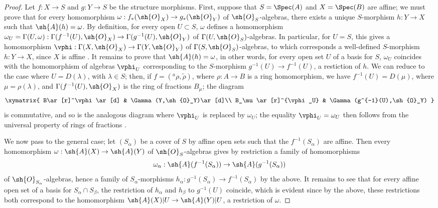 \begin{proof}
\label{proof-2.1.2.7}
Let $f:X\to S$ and $g:Y\to S$ be the structure morphisms.
First, suppose that $S=\Spec(A)$ and $X=\Spec(B)$ are affine; we must prove that for every homomorphism $\omega:f_*(\sh{O}_X)\to g_*(\sh{O}_Y)$ of $\sh{O}_S$-algebras, there exists a unique $S$-morphism $h:Y\to X$ such that $\sh{A}(h)=\omega$.
By definition, for every open $U\subset S$, $\omega$ defines a homomorphism $\omega_U=\Gamma(U,\omega):\Gamma(f^{-1}(U),\sh{O}_X)\to\Gamma(g^{-1}(U),\sh{O}_Y)$ of $\Gamma(U,\sh{O}_S)$-algebras.
In particular, for $U=S$, this gives a homomorphism $\vphi:\Gamma(X,\sh{O}_X)\to\Gamma(Y,\sh{O}_Y)$ of $\Gamma(S,\sh{O}_S)$-algebras, to which corresponds a well-defined $S$-morphism $h:Y\to X$, since $X$ is affine .
It remains to prove that $\sh{A}(h)=\omega$, in other words, for every open set $U$ of a basis for $S$, $\omega_U$ coincides with the homomorphism of algebras $\vphi_U$ corresponding to the $S$-morphism $g^{-1}(U)\to f^{-1}(U)$, a restiction of $h$.
We can reduce to the case where $U=D(\lambda)$, with $\lambda\in S$; then, if $f=({}^a\rho,\widetilde{\rho})$, where $\rho:A\to B$ is a ring homomorphism, we have $f^{-1}(U)=D(\mu)$, where $\mu=\rho(\lambda)$, and $\Gamma(f^{-1}(U),\sh{O}_X)$ is the ring of fractions $B_\mu$; the diagram
\[
  \xymatrix{
    B\ar[r]^\vphi\ar[d] &
    \Gamma(Y,\sh{O}_Y)\ar[d]\\
    B_\mu\ar[r]^{\vphi_U} &
    \Gamma(g^{-1}(U),\sh{O}_Y)
  }
\]
is commutative, and so is the analogous diagram where $\vphi_U$ is replaced by $\omega_U$; the equality $\vphi_U=\omega_U$ then follows from the universal property of rings of fractions .

We now pass to the general case; let $(S_\alpha)$ be a cover of $S$ by affine open sets
such that the $f^{-1}(S_\alpha)$ are affine.
Then every homomorphism $\omega:\sh{A}(X)\to\sh{A}(Y)$ of $\sh{O}_S$-algebras gives by restriction a family of homomorphisms
\[
  \omega_\alpha:\sh{A}(f^{-1}(S_\alpha))\to\sh{A}(g^{-1}(S_\alpha))
\]
of $\sh{O}_{S_\alpha}$-algebras, hence a family of $S_\alpha$-morphisms $h_\alpha:g^{-1}(S_\alpha)\to f^{-1}(S_\alpha)$ by the above.
It remains to see that for every affine open set of a basis for $S_\alpha\cap S_\beta$, the restriction of $h_\alpha$ and $h_\beta$ to $g^{-1}(U)$ coincide, which is evident since by the above, these restrictions both correspond to the homomorphism $\sh{A}(X)|U\to\sh{A}(Y)|U$, a restriction of $\omega$.
\end{proof}

